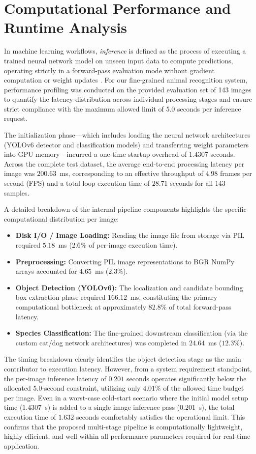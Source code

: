 \section{Computational Performance and Runtime Analysis}
\label{sec:speed}

In machine learning workflows, \textit{inference} is defined as the process of executing a trained neural network model on unseen input data to compute predictions, operating strictly in a forward-pass evaluation mode without gradient computation or weight updates \cite{goodfellow2016deep}. For our fine-grained animal recognition system, performance profiling was conducted on the provided evaluation set of 143 images to quantify the latency distribution across individual processing stages and ensure strict compliance with the maximum allowed limit of 5.0 seconds per inference request.

The initialization phase—which includes loading the neural network architectures (YOLOv6 detector and classification models) and transferring weight parameters into GPU memory—incurred a one-time startup overhead of $1.4307$ seconds. Across the complete test dataset, the average end-to-end processing latency per image was $200.63$~ms, corresponding to an effective throughput of $4.98$ frames per second (FPS) and a total loop execution time of $28.71$ seconds for all 143 samples.

A detailed breakdown of the internal pipeline components highlights the specific computational distribution per image:
\begin{itemize}
    \item \textbf{Disk I/O / Image Loading:} Reading the image file from storage via PIL required $5.18$~ms ($2.6\%$ of per-image execution time).
    \item \textbf{Preprocessing:} Converting PIL image representations to BGR NumPy arrays accounted for $4.65$~ms ($2.3\%$).
    \item \textbf{Object Detection (YOLOv6):} The localization and candidate bounding box extraction phase required $166.12$~ms, constituting the primary computational bottleneck at approximately $82.8\%$ of total forward-pass latency.
    \item \textbf{Species Classification:} The fine-grained downstream classification (via the custom cat/dog network architectures) was completed in $24.64$~ms ($12.3\%$).
\end{itemize}

The timing breakdown clearly identifies the object detection stage as the main contributor to execution latency. However, from a system requirement standpoint, the per-image inference latency of $0.201$ seconds operates significantly below the allocated 5.0-second constraint, utilizing only $4.01\%$ of the allowed time budget per image. Even in a worst-case cold-start scenario where the initial model setup time ($1.4307$~s) is added to a single image inference pass ($0.201$~s), the total execution time of $1.632$ seconds comfortably satisfies the operational limit. This confirms that the proposed multi-stage pipeline is computationally lightweight, highly efficient, and well within all performance parameters required for real-time application.


